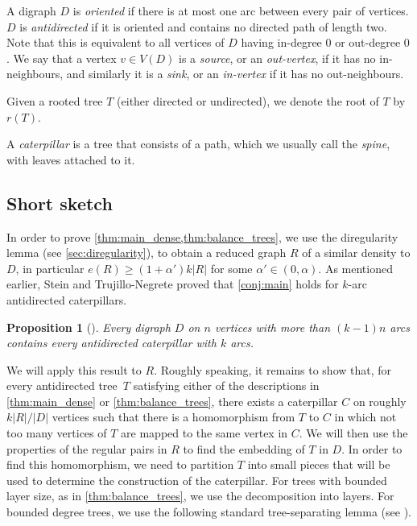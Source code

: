 \documentclass[11pt]{article}
\newtheorem{proposition}[theorem]{Proposition}
\numberwithin{equation}{section}
\renewcommand{\geq}{\geqslant}
\newcommand{\defi}[1]{\emph{\color{red!50!black}#1}}
\theoremstyle{definition}
\begin{document}
A digraph $D$ is \defi{oriented} if there is at most one arc between every pair of vertices. $D$ is \defi{antidirected}
if it is oriented and contains no directed path of length two. Note that this is equivalent to all vertices of $D$ having in-degree $0$ or out-degree $0$. We say that a vertex $v\in V(D)$ is a \defi{source}, or an \defi{out-vertex}, if it has no in-neighbours, and similarly it is a \defi{sink}, or an \defi{in-vertex} if it has no out-neighbours.

Given a rooted tree $T$ (either directed or undirected), we denote the root of $T$ by $r(T)$.

A \defi{caterpillar} is a tree that consists of a path, which we usually call the \defi{spine}, with leaves attached to it.

\subsection{Short sketch}

In order to prove \cref{thm:main_dense,thm:balance_trees}, we use the diregularity lemma (see \cref{sec:diregularity}), to obtain a reduced graph $R$ of a similar density to $D$, in particular $e(R)\geq (1+\alpha')k|R|$ for some $\alpha'\in (0,\alpha)$. As mentioned earlier, Stein and Trujillo-Negrete proved that \cref{conj:main} holds for $k$-arc antidirected caterpillars.

\begin{proposition}[\cite{stein_trujillo-negrete2025}]\label{prop:ST_caterpillar}
	Every digraph $D$ on $n$ vertices with more than $(k-1)n$ arcs contains every antidirected caterpillar 
	with $k$ arcs. 
\end{proposition}

We will apply this result to $R$. Roughly speaking, it remains to show that, for every antidirected tree~$T$ satisfying either of the descriptions in \cref{thm:main_dense} or \cref{thm:balance_trees}, there exists a caterpillar $C$ on roughly~$k|R|/|D|$ vertices such that there is a homomorphism from $T$ to $C$ in which not too many vertices of $T$ are mapped to the same vertex in $C$. We will then use the properties of the regular pairs in $R$ to find the embedding of $T$ in $D$. In order to find this homomorphism,  we need to partition $T$ into small pieces that will be used to determine the construction of the caterpillar. For trees with bounded layer size, as in \cref{thm:balance_trees}, we use the decomposition into layers. For bounded degree trees, we use the following standard tree-separating lemma (see \cite{BPS1}).
\end{document}
